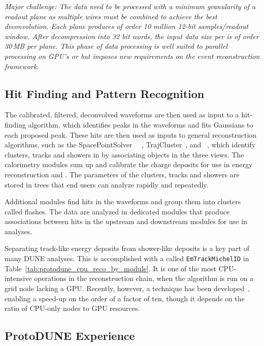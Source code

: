 \documentclass[../main-v1.tex]{subfiles}
\begin{document}
{\it Major challenge: The  data need to be processed with a minimum granularity of a readout plane as multiple wires must be combined to achieve the best \twod deconvolution.  Each plane produces of order 10 million 12-bit samples/readout window. After decompression into 32 bit words, the input data size %
per  is of order 30\,MB per plane. This phase of data processing is well suited to parallel processing on GPU's or  but imposes new requirements on the event reconstruction framework. }

\subsection{Hit Finding and Pattern Recognition}

The calibrated, filtered, deconvolved waveforms are then used as input to a hit-finding algorithm, which identifies peaks in the waveforms and fits Gaussians to each proposed peak.  These hits are then used as inputs to general reconstruction algorithms, such as the SpacePointSolver~\cite{DUNE:2020ypp} ~\cite{Marshall:2015rfa}, TrajCluster~\cite{ref:trajcluster}, and ~\cite{ref:PMA}, which identify clusters, tracks and showers in \threed by associating objects in the three \twod views.  The calorimetry modules sum up and calibrate the charge deposits for use in energy reconstruction and .  The parameters of the clusters, tracks and showers are stored in  trees that end users can analyze rapidly and repeatedly.

Additional modules find hits in the  waveforms and group them into clusters called flashes.  The  data are analyzed in dedicated modules that produce associations between hits in the upstream and downstream  modules for use in analyses.

Separating track-like energy deposits from shower-like deposits is a key part of many DUNE analyses.  This is accomplished with a  called {\tt EmTrackMichelID} in Table~\ref{tab:protodune_cpu_reco_by_module}.  It is one of the most CPU-intensive operations in the  reconstruction chain, when the algorithm is run on a grid node lacking a GPU.  Recently, however, a  technique has been developed~\cite{Wang:2020fjr}, enabling a speed-up on the order of a factor of ten, though it depends on the ratio of CPU-only nodes to GPU resources.


\subsection{ProtoDUNE Experience}
\end{document}
